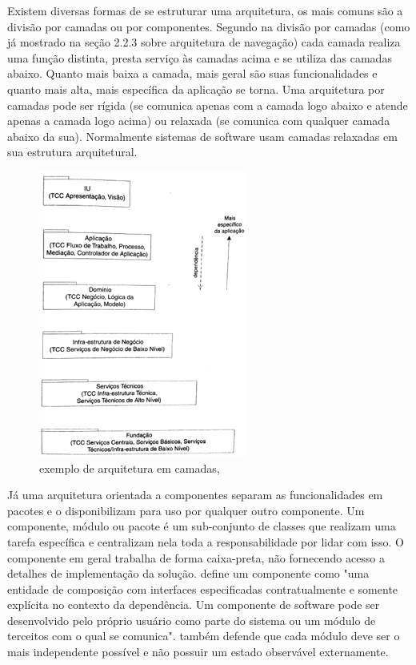 Existem diversas formas de se estruturar uma arquitetura, os mais comuns são a divisão por camadas ou por componentes. Segundo \cite{Larman2005} na divisão por camadas (como já mostrado na seção 2.2.3 sobre arquitetura de navegação) cada camada realiza uma função distinta, presta serviço às camadas acima e se utiliza das camadas abaixo. Quanto mais baixa a camada, mais geral são suas funcionalidades e quanto mais alta, mais específica da aplicação se torna. Uma arquitetura por camadas pode ser rígida (se comunica apenas com a camada logo abaixo e atende apenas a camada logo acima) ou relaxada (se comunica com qualquer camada abaixo da sua). Normalmente sistemas de software usam camadas relaxadas em sua estrutura arquitetural.

\begin{figure}[h]
	\centering
	\label{fig12}
		\includegraphics[keepaspectratio=true,scale=0.5]{figuras/arqcamadas.jpg}
	\caption{exemplo de arquitetura em camadas, \cite{Larman2005}}
\end{figure}

Já uma arquitetura orientada a componentes separam as funcionalidades em pacotes e o disponibilizam para uso por qualquer outro componente. Um componente, módulo ou pacote é um sub-conjunto de classes que realizam uma tarefa específica e centralizam nela toda a responsabilidade por lidar com isso. O componente em geral trabalha de forma caixa-preta, não fornecendo acesso a detalhes de implementação da solução. \cite{Szyperski2002} define um componente como "uma entidade de composição com interfaces especificadas contratualmente e somente explícita no contexto da dependência. Um componente de software pode ser desenvolvido pelo próprio usuário como parte do sistema ou um módulo de terceitos com o qual se comunica". \cite{Szyperski2002} também defende que cada módulo deve ser o mais independente possível e não possuir um estado observável externamente.

